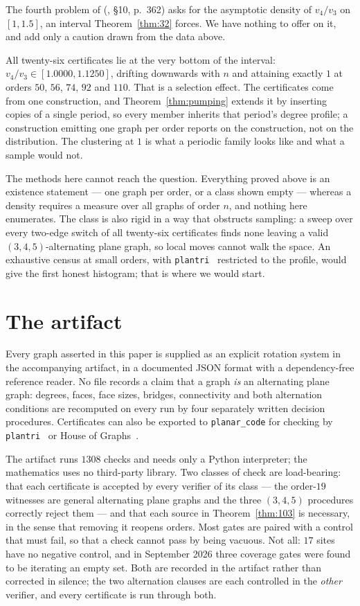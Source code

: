 \documentclass{baustms}
\theoremstyle{cupthm}
\theoremstyle{cupdefn}
\theoremstyle{cuprem}
\begin{document}
The fourth problem of (\cite{AHSSV2015}, \S10, p.~362) asks for the asymptotic
density of $v_4/v_3$ on $[1,1.5]$, an interval Theorem~\ref{thm:32} forces. We
have nothing to offer on it, and add only a caution drawn from the data above.

All twenty-six certificates lie at the very bottom of the interval:
$v_4/v_3 \in [1.0000, 1.1250]$, drifting downwards with $n$ and attaining
exactly $1$ at orders $50$, $56$, $74$, $92$ and $110$. That is a selection
effect. The certificates come from one construction, and
Theorem~\ref{thm:pumping} extends it by inserting copies of a single period, so
every member inherits that period's degree profile; a construction emitting one
graph per order reports on the construction, not on the distribution. The
clustering at $1$ is what a periodic family looks like and what a sample would
not.

The methods here cannot reach the question. Everything proved above is an
existence statement --- one graph per order, or a class shown empty --- whereas
a density requires a measure over all graphs of order $n$, and nothing here
enumerates. The class is also rigid in a way that obstructs sampling: a sweep
over every two-edge switch of all twenty-six certificates finds none leaving a
valid $(3,4,5)$-alternating plane graph, so local moves cannot walk the space.
An exhaustive census at small orders, with \texttt{plantri}~\cite{plantri}
restricted to the profile, would give the first honest histogram; that is where
we would start.

\section{The artifact}\label{sec:artifact}

Every graph asserted in this paper is supplied as an explicit rotation system in
the accompanying artifact, in a documented JSON format with a dependency-free
reference reader. No file records a claim that a graph \emph{is} an alternating
plane graph: degrees, faces, face sizes, bridges, connectivity and both
alternation conditions are recomputed on every run by four separately written
decision procedures. Certificates can also be exported to \texttt{planar\_code}
for checking by \texttt{plantri}~\cite{plantri} or House of Graphs~\cite{HoG}.

The artifact runs $1308$ checks and needs only a Python interpreter; the
mathematics uses no third-party library. Two classes of check are load-bearing:
that each certificate is accepted by every verifier of its class --- the
order-$19$ witnesses are general alternating plane graphs and the three
$(3,4,5)$ procedures correctly reject them --- and that each source in
Theorem~\ref{thm:103} is necessary, in the sense that removing it reopens
orders. Most gates are paired with a control that must fail, so that a check
cannot pass by being vacuous. Not all: $17$ sites have no negative control, and in
September 2026 three coverage gates were found to be iterating an empty set.
Both are recorded in the artifact rather than corrected in silence; the two
alternation clauses are each controlled in the \emph{other} verifier, and every
certificate is run through both.
\end{document}

